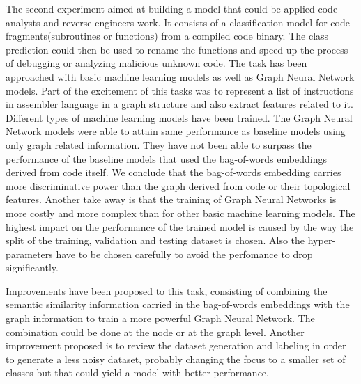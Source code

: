 

The second experiment aimed at building a model that could be applied code analysts and reverse engineers work. It consists of a  classification model for code fragments(subroutines or functions) from a compiled code binary. The class prediction could then be used to rename the functions and speed up the process of debugging or analyzing malicious unknown code. The task has been approached with basic machine learning models as well as Graph Neural Network models. Part of the excitement of this tasks was to represent a list of instructions in assembler language in a graph structure and also extract features related to it. 
Different types of machine learning models have been trained. The Graph Neural Network models were able to attain same performance as baseline models using only graph related information. They have not been able to surpass the performance of the baseline models that used the bag-of-words embeddings derived from code itself.
We conclude that the bag-of-words embedding carries more discriminative power than the graph derived from code or their topological features. Another take away is that the training of Graph Neural Networks is more costly and more complex than for other basic machine learning models. The highest impact on the performance of the trained model is caused by the way the split of the training, validation and testing dataset is chosen. Also the hyper-parameters have to be chosen carefully to avoid the perfomance to drop significantly.

Improvements have been proposed to this task, consisting of combining the semantic similarity information carried in the bag-of-words embeddings with the graph information to train a more powerful Graph Neural Network. The combination could be done at the node or at the graph level. Another improvement proposed is to review the dataset generation and labeling in order to generate a less noisy dataset, probably changing the focus to a smaller set of classes but that could yield a model with better performance.







